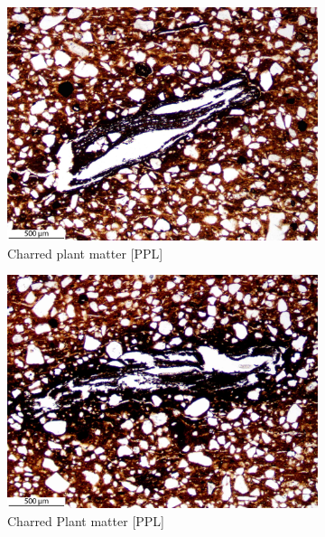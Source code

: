 \documentclass[a4paper]{article}
\begin{document}
\begin{figure}[H]
\begin{subfigure}[t]{.32\textwidth}
		\includegraphics[width=\textwidth]{ThinSections/96-1_4x_PPL.jpg}
		\caption{Charred plant matter [PPL]}
	\end{subfigure}\hspace{.1em}\hfill
	\begin{subfigure}[t]{.32\textwidth}
		\includegraphics[width=\textwidth]{ThinSections/96-6_4x_PPL.jpg}
		\caption{Charred Plant matter [PPL]}
	\end{subfigure}\hspace{.1em}\hfill
	\begin{subfigure}[t]{.32\textwidth}

\end{subfigure}
\end{figure}
\end{document}
